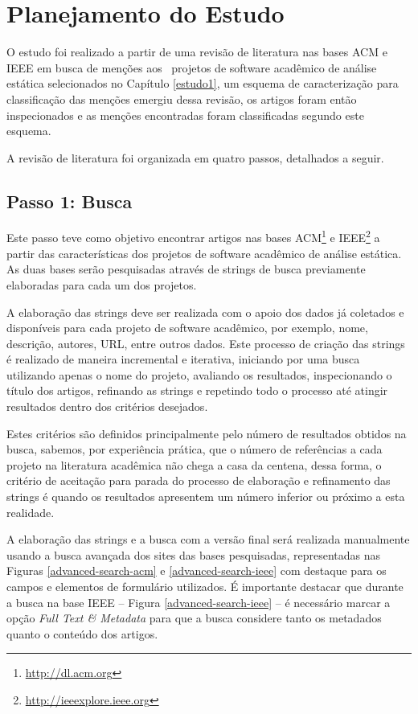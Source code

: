 
\section{Planejamento do Estudo} \label{estudo2:planejamento} %

O estudo foi realizado a partir de uma revisão de literatura nas bases ACM e
IEEE em busca de menções aos \SoftwareCount \ projetos de software acadêmico de
análise estática selecionados no Capítulo \ref{estudo1}, um esquema de
caracterização para classificação das menções emergiu dessa revisão, os artigos
foram então inspecionados e as menções encontradas foram classificadas segundo
este esquema.

A revisão de literatura foi organizada em quatro passos, detalhados a seguir.

\subsection{Passo 1: Busca}

Este passo teve como objetivo encontrar artigos nas bases
ACM\footnote{\url{http://dl.acm.org}} e
IEEE\footnote{\url{http://ieeexplore.ieee.org}} a partir das características
dos projetos de software acadêmico de análise estática.
As duas bases serão pesquisadas através de strings de busca previamente
elaboradas para cada um dos projetos.

A elaboração das strings deve ser realizada com o apoio dos dados já coletados
e disponíveis para cada projeto de software acadêmico, por exemplo, nome,
descrição, autores, URL, entre outros dados. Este processo de criação das
strings é realizado de maneira incremental e iterativa, iniciando por uma busca
utilizando apenas o nome do projeto, avaliando os resultados, inspecionando o
título dos artigos, refinando as strings e repetindo todo o processo até
atingir resultados dentro dos critérios desejados.

Estes critérios são definidos principalmente pelo
número de resultados obtidos na busca,
sabemos, por experiência prática, que o número de referências a cada projeto na
literatura acadêmica não chega a casa da centena, dessa forma, o critério de
aceitação para parada do processo de elaboração e refinamento das strings é
quando os resultados apresentem um número inferior ou próximo a esta realidade.

A elaboração das strings e a busca com a versão final será
realizada manualmente usando a busca avançada dos sites das bases pesquisadas,
representadas nas Figuras \ref{advanced-search-acm} e
\ref{advanced-search-ieee} com destaque para os campos e elementos de formulário
utilizados. É importante destacar que durante a busca na
base IEEE -- Figura \ref{advanced-search-ieee} -- é necessário marcar a opção {\it Full Text \& Metadata} para que a
busca considere tanto os metadados quanto o conteúdo dos artigos.


